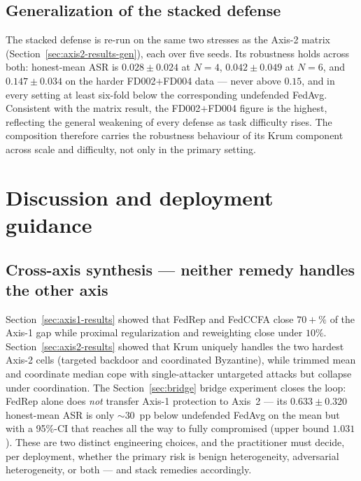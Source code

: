 \documentclass[a4paper,fleqn,doubleblind]{cas-sc}
\begin{document}
\subsection{Generalization of the stacked defense}
\label{sec:bridge-stacked-gen}

The stacked defense is re-run on the same two stresses as the Axis-2
matrix (Section~\ref{sec:axis2-results-gen}), each over five seeds.
Its robustness holds across both: honest-mean ASR is
$0.028 \pm 0.024$ at $N = 4$, $0.042 \pm 0.049$ at $N = 6$, and
$0.147 \pm 0.034$ on the harder FD002$+$FD004 data --- never above
$0.15$, and in every setting at least six-fold below the
corresponding undefended FedAvg. Consistent with the matrix result,
the FD002$+$FD004 figure is the highest, reflecting the general
weakening of every defense as task difficulty rises. The composition
therefore carries the robustness behaviour of its Krum component
across scale and difficulty, not only in the primary setting.



\section{Discussion and deployment guidance}
\label{sec:discuss}

\subsection{Cross-axis synthesis --- neither remedy handles the other axis}
\label{sec:discuss-synthesis}

Section~\ref{sec:axis1-results} showed that FedRep and FedCCFA close
$70+\%$ of the Axis-1 gap while proximal regularization and
reweighting close under $10\%$. Section~\ref{sec:axis2-results}
showed that Krum uniquely handles the two hardest Axis-2 cells
(targeted backdoor and coordinated Byzantine), while trimmed mean
and coordinate median cope with single-attacker untargeted attacks
but collapse under coordination. The Section~\ref{sec:bridge}
bridge experiment closes the loop: FedRep alone does \emph{not}
transfer Axis-1 protection to Axis~2 --- its $0.633 \pm 0.320$
honest-mean ASR is only $\sim 30$~pp below undefended FedAvg on the
mean but with a 95\%-CI that reaches all the way to fully
compromised (upper bound $1.031$). These are two distinct engineering
choices, and the practitioner must decide, per deployment, whether
the primary risk is benign heterogeneity, adversarial heterogeneity,
or both --- and stack remedies accordingly.
\end{document}
